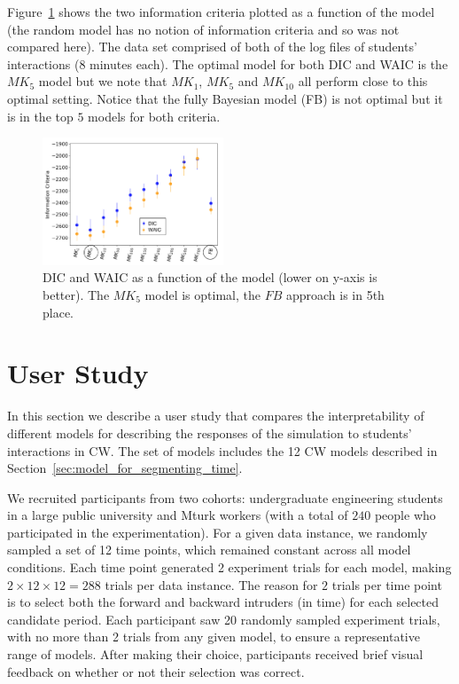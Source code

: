 \documentclass[letterpaper]{article} %
\begin{document}
Figure~\ref{fig:dic_waic_scores} shows the two information criteria plotted as a function of the model (the random model has no notion of information criteria and so was not compared here). The data set comprised of both of the log files of students' interactions (8 minutes each). The optimal model for both DIC and WAIC is the $MK_{5}$ model but we note that $MK_{1}$, $MK_{5}$ and $MK_{10}$ all perform close to this optimal setting. Notice that the fully Bayesian model (FB) is not optimal but it is in the top $5$ models for both criteria.
\begin{figure}[t]
\centering
\includegraphics[width=0.48\textwidth]{images/dic_waic_scores.png}
\caption{DIC and WAIC as a function of the model (lower on y-axis is better). The $MK_5$ model is optimal, the $FB$ approach is in 5th place.}
\label{fig:dic_waic_scores}
\end{figure}











\section{User Study}
\label{sec:interpretability_results}



In this section we describe a user study that compares the interpretability of different models for describing the responses of the simulation to students' interactions in CW.
The set of models includes the 12 CW models described in Section~\ref{sec:model_for_segmenting_time}.%









We recruited participants from two cohorts: undergraduate engineering students in a large public university
and Mturk workers (with a total of $240$ people who participated in the experimentation).
For a given data instance, we randomly sampled a set of 12 time points, which  remained constant across all model conditions.
Each time point generated 2 experiment trials for each model, making $2 \times 12 \times 12=288$ trials per data instance. The reason for $2$ trials per time point is to select both the forward and backward intruders (in time) for each selected candidate period. Each participant saw 20 randomly sampled experiment trials, with no more than 2 trials from any given model, to ensure a representative range of models.
After making their choice, participants received brief visual feedback on whether or not their selection was correct.
\end{document}
